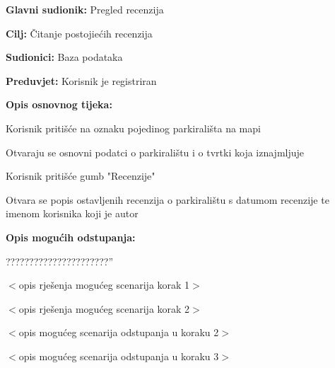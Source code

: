 \noindent {}
\begin{packed_item}
	
	\item \textbf{Glavni sudionik: }Pregled recenzija
	\item  \textbf{Cilj:} Čitanje postojiećih recenzija
	\item  \textbf{Sudionici:} Baza podataka
	\item  \textbf{Preduvjet:} Korisnik je registriran
	\item  \textbf{Opis osnovnog tijeka:}
	
	\item[] \begin{packed_enum}
		
		\item Korisnik pritišće na oznaku pojedinog parkirališta na mapi
		\item Otvaraju se osnovni podatci o parkiralištu i o tvrtki koja iznajmljuje
		\item Korisnik pritišće gumb "Recenzije"
		\item Otvara se popis ostavljenih recenzija o parkiralištu s datumom recenzije te imenom korisnika koji je autor
	
	\end{packed_enum}
	
	\item  \textbf{Opis mogućih odstupanja:}
	
	\item[] \begin{packed_item}
		
		\item[2.a]??????????????????????''
		\item[] \begin{packed_enum}
			
			\item $<$opis rješenja mogućeg scenarija korak 1$>$
			\item $<$opis rješenja mogućeg scenarija korak 2$>$
			
		\end{packed_enum}
		\item[2.b] $<$opis mogućeg scenarija odstupanja u koraku 2$>$
		\item[3.a] $<$opis mogućeg scenarija odstupanja  u koraku 3$>$
		
	\end{packed_item}
\end{packed_item}


